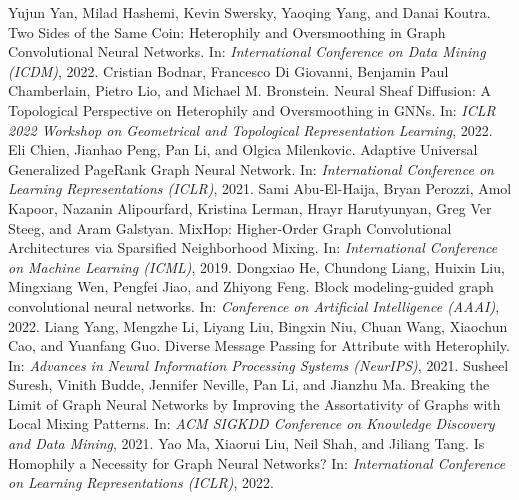 \documentclass[conference]{IEEEtran}
\begin{document}
\begin{thebibliography}{00}
 Yujun Yan, Milad Hashemi, Kevin Swersky, Yaoqing Yang, and Danai Koutra. Two Sides of the Same Coin: Heterophily and Oversmoothing in Graph Convolutional Neural Networks. In: \textit{International Conference on Data Mining (ICDM)}, 2022.
 Cristian Bodnar, Francesco Di Giovanni, Benjamin Paul Chamberlain, Pietro Lio, and Michael M. Bronstein. Neural Sheaf Diffusion: A Topological Perspective on Heterophily and Oversmoothing in GNNs. In: \textit{ICLR 2022 Workshop on Geometrical and Topological Representation Learning}, 2022. 
 Eli Chien, Jianhao Peng, Pan Li, and Olgica Milenkovic. Adaptive Universal Generalized PageRank Graph Neural Network. In: \textit{International Conference on Learning Representations (ICLR)}, 2021. 
Sami Abu-El-Haija, Bryan Perozzi, Amol Kapoor, Nazanin Alipourfard, Kristina Lerman, Hrayr Harutyunyan, Greg Ver Steeg, and Aram Galstyan. MixHop: Higher-Order Graph Convolutional Architectures via Sparsified Neighborhood Mixing. In: \textit{International Conference on Machine Learning (ICML)}, 2019.
Dongxiao He, Chundong Liang, Huixin Liu, Mingxiang Wen, Pengfei Jiao, and Zhiyong Feng. Block modeling-guided graph convolutional neural networks. In: \textit{Conference on Artificial Intelligence (AAAI)}, 2022.
Liang Yang, Mengzhe Li, Liyang Liu, Bingxin Niu, Chuan Wang, Xiaochun Cao, and Yuanfang Guo. Diverse Message Passing for Attribute with Heterophily. In: \textit{Advances in Neural Information Processing Systems (NeurIPS)}, 2021.
Susheel Suresh, Vinith Budde, Jennifer Neville, Pan Li, and Jianzhu Ma. Breaking the Limit of Graph Neural Networks by Improving the Assortativity of Graphs with Local Mixing Patterns. In: \textit{ACM SIGKDD Conference on Knowledge Discovery and Data Mining}, 2021.
Yao Ma, Xiaorui Liu, Neil Shah, and Jiliang Tang. Is Homophily a Necessity for Graph Neural Networks? In: \textit{International Conference on Learning Representations (ICLR)}, 2022.


\end{thebibliography}
\end{document}
